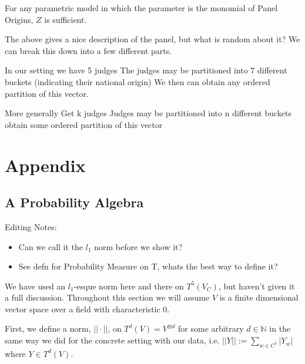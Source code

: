 \documentclass{article}
\begin{document}
For any parametric model in which the parameter is the monomial of Panel Origins, $Z$ is sufficient.

The above gives a nice description of the panel, but what is random about it? We can break this down into a few different parts.

In our setting we have 5 judges
The judges may be partitioned into 7 different buckets (indicating their national origin)
We then can obtain any ordered partition of this vector. 

More generally
Get k judges
Judges may be partitioned into n different buckets
obtain some ordered partition of this vector

\section{Appendix}
\subsection{A Probability Algebra}
Editing Notes:
\begin{itemize}
\item Can we call it the $l_1$ norm  before we show it?
\item See defn for Probability Measure on T, whats the best way to define it?
\end{itemize}

We have used an $l_1$-esque norm here and there on $T^5(V_C)$, but haven't given it a full discussion. Throughout this section we will assume $V$ is a finite dimensional vector space over a field with characteristic 0.

First, we define a norm, $||\cdot ||$, on $T^d(V) = V^{\otimes d}$ for some arbitrary $d\in \mathbb{N}$ in the same way we did for the concrete setting with our data, i.e. $|| Y || := \sum_{w \in C^5} |Y_w|$ where $Y\in T^d(V)$.
\end{document}
